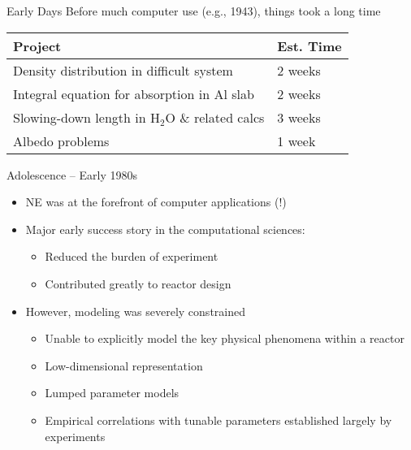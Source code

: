 \documentclass[xcolor=x11names,compress]{beamer}
\renewcommand{\(}{\begin{columns}}
\renewcommand{\)}{\end{columns}}
\newcommand{\<}[1]{\begin{column}{#1}}
\renewcommand{\>}{\end{column}}
\begin{document}
\begin{frame}{Early Days}
Before much computer use (e.g., 1943), things took a long time
\begin{tabu}{|X | l|}
\hline
Project & Est. Time \\\hline
Density distribution in difficult system & 2 weeks \\
Integral equation for absorption in Al slab & 2 weeks \\
Slowing-down length in H$_2$O \& related calcs & 3 weeks \\
Albedo problems & 1 week \\\hline
\end{tabu}
\begin{center}
\end{center}
\end{frame}

\begin{frame}{Adolescence -- Early 1980s}
\begin{itemize}
\item NE was at the forefront of computer applications (!)
\item Major early success story in the computational sciences:
\begin{itemize}
\item Reduced the burden of experiment
\item Contributed greatly to reactor design
\end{itemize}
\item However, modeling was severely constrained 
\begin{itemize}
\item Unable to explicitly model the key physical phenomena within a reactor
\item Low-dimensional representation
\item Lumped parameter models
\item Empirical correlations with tunable parameters established largely by experiments
\end{itemize}
\end{itemize}
\end{frame}
\end{document}
